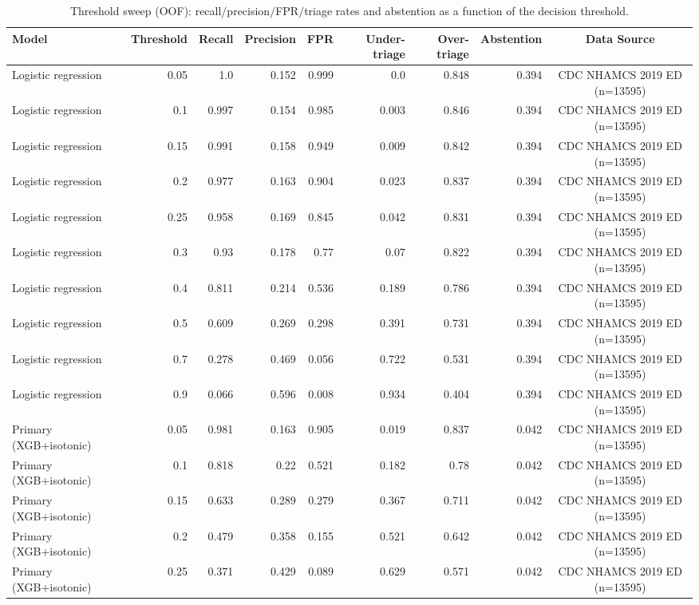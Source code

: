 \begin{table}[t]
\centering
\caption{Threshold sweep (OOF): recall$/$precision$/$FPR$/$triage rates and abstention as a function of the decision threshold.}
\label{tab:threshold_sweep}
\begin{tabular}{lrrrrrrrc}
\toprule
Model & Threshold & Recall & Precision & FPR & Under-triage & Over-triage & Abstention & Data Source \\
\midrule
Logistic regression & 0.05 & 1.0 & 0.152 & 0.999 & 0.0 & 0.848 & 0.394 & CDC NHAMCS 2019 ED (n=13595) \\
Logistic regression & 0.1 & 0.997 & 0.154 & 0.985 & 0.003 & 0.846 & 0.394 & CDC NHAMCS 2019 ED (n=13595) \\
Logistic regression & 0.15 & 0.991 & 0.158 & 0.949 & 0.009 & 0.842 & 0.394 & CDC NHAMCS 2019 ED (n=13595) \\
Logistic regression & 0.2 & 0.977 & 0.163 & 0.904 & 0.023 & 0.837 & 0.394 & CDC NHAMCS 2019 ED (n=13595) \\
Logistic regression & 0.25 & 0.958 & 0.169 & 0.845 & 0.042 & 0.831 & 0.394 & CDC NHAMCS 2019 ED (n=13595) \\
Logistic regression & 0.3 & 0.93 & 0.178 & 0.77 & 0.07 & 0.822 & 0.394 & CDC NHAMCS 2019 ED (n=13595) \\
Logistic regression & 0.4 & 0.811 & 0.214 & 0.536 & 0.189 & 0.786 & 0.394 & CDC NHAMCS 2019 ED (n=13595) \\
Logistic regression & 0.5 & 0.609 & 0.269 & 0.298 & 0.391 & 0.731 & 0.394 & CDC NHAMCS 2019 ED (n=13595) \\
Logistic regression & 0.7 & 0.278 & 0.469 & 0.056 & 0.722 & 0.531 & 0.394 & CDC NHAMCS 2019 ED (n=13595) \\
Logistic regression & 0.9 & 0.066 & 0.596 & 0.008 & 0.934 & 0.404 & 0.394 & CDC NHAMCS 2019 ED (n=13595) \\
Primary (XGB+isotonic) & 0.05 & 0.981 & 0.163 & 0.905 & 0.019 & 0.837 & 0.042 & CDC NHAMCS 2019 ED (n=13595) \\
Primary (XGB+isotonic) & 0.1 & 0.818 & 0.22 & 0.521 & 0.182 & 0.78 & 0.042 & CDC NHAMCS 2019 ED (n=13595) \\
Primary (XGB+isotonic) & 0.15 & 0.633 & 0.289 & 0.279 & 0.367 & 0.711 & 0.042 & CDC NHAMCS 2019 ED (n=13595) \\
Primary (XGB+isotonic) & 0.2 & 0.479 & 0.358 & 0.155 & 0.521 & 0.642 & 0.042 & CDC NHAMCS 2019 ED (n=13595) \\
Primary (XGB+isotonic) & 0.25 & 0.371 & 0.429 & 0.089 & 0.629 & 0.571 & 0.042 & CDC NHAMCS 2019 ED (n=13595) \\

\end{tabular}
\end{table}
